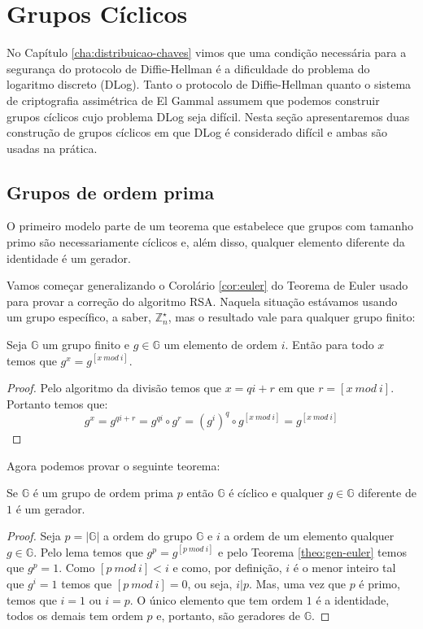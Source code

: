 \chapter{Grupos Cíclicos}
\label{cha:ciclicos}

No Capítulo \ref{cha:distribuicao-chaves} vimos que uma condição necessária para a segurança do protocolo de Diffie-Hellman é a dificuldade do problema do logaritmo discreto (DLog). 
Tanto o protocolo de Diffie-Hellman quanto o sistema de criptografia assimétrica de El Gammal assumem que podemos construir grupos cíclicos cujo problema DLog seja difícil.
Nesta seção apresentaremos duas construção de grupos cíclicos em que DLog é considerado difícil e ambas são usadas na prática.

\section{Grupos de ordem prima}
\label{sec:grupos-de-ordem}

O primeiro modelo parte de um teorema que estabelece que grupos com tamanho primo são necessariamente cíclicos e, além disso, qualquer elemento diferente da identidade é um gerador.

Vamos começar generalizando o Corolário \ref{cor:euler} do Teorema de Euler usado para provar a correção do algoritmo RSA.
Naquela situação estávamos usando um grupo específico, a saber, $\mathbb{Z}_n^\star$, mas o resultado vale para qualquer grupo finito: 


\begin{lemma}
   Seja $\mathbb{G}$ um grupo finito e $g \in \mathbb{G}$ um elemento de ordem $i$.
  Então para todo $x$ temos que $g^x = g^{[x\ mod\ i]}$.
\end{lemma}
\begin{proof}
Pelo algoritmo da divisão temos que $x = qi +r$ em que $r = [x\ mod\ i]$.
Portanto temos que:
\begin{displaymath}
  g^x = g^{qi + r} = g^{qi} \circ g^r = (g^i)^q \circ g^{[x\ mod\ i]} = g^{[x\ mod\ i]}
\end{displaymath}
\end{proof}

Agora podemos provar o seguinte teorema:

\begin{theorem}
  Se $\mathbb{G}$ é um grupo de ordem prima $p$ então $\mathbb{G}$ é cíclico e qualquer $g \in \mathbb{G}$ diferente de $1$ é um gerador.
\end{theorem}
\begin{proof}
  Seja $p = |\mathbb{G}|$ a ordem do grupo $\mathbb{G}$ e $i$ a ordem de um elemento qualquer $g \in \mathbb{G}$. 
  Pelo lema temos que $g^p = g^{[p\ mod\ i]}$ e pelo Teorema \ref{theo:gen-euler} temos que $g^p = 1$. 
  Como $[p\ mod\ i] < i$ e como, por definição, $i$ é o menor inteiro tal que $g^i = 1$ temos que $[p\ mod\ i] = 0$, ou seja, $i|p$.
  Mas, uma vez que $p$ é primo, temos que $i = 1$ ou $i = p$.
  O único elemento que tem ordem $1$ é a identidade, todos os demais tem ordem $p$ e, portanto, são geradores de $\mathbb{G}$.
\end{proof}

